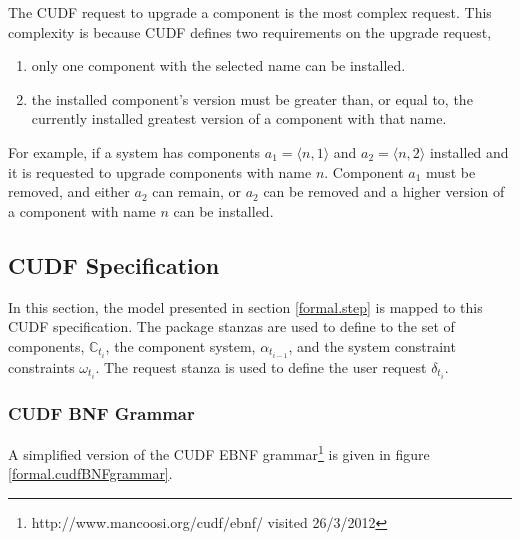 The CUDF request to upgrade a component is the most complex request.
This complexity is because CUDF defines two requirements on the upgrade request,
\begin{enumerate}
  \item only one component with the selected name can be installed.
  \item the installed component's version must be greater than, or equal to, the currently installed greatest version of a component with that name.
\end{enumerate}
For example, if a system has components $a_1 = \langle n,1 \rangle$ and $a_2 = \langle n,2 \rangle$ installed and it is requested to upgrade components with name $n$.
Component $a_1$ must be removed, and either $a_2$ can remain, or $a_2$ can be removed and a higher version of a component with name $n$ can be installed.

\subsection{CUDF Specification}
In this section, the model presented in section \ref{formal.step} is mapped to this CUDF specification.
The package stanzas are used to define to the set of components, $\mathbb{C}_{t_i}$, the component system, $\alpha_{t_{i-1}}$, and the system constraint constraints $\omega_{t_i}$. 
The request stanza is used to define the user request $\delta_{t_i}$. 

\subsubsection{CUDF BNF Grammar}
A simplified version of the CUDF EBNF grammar\footnote{http://www.mancoosi.org/cudf/ebnf/ visited 26/3/2012} is given in figure \ref{formal.cudfBNFgrammar}. 

